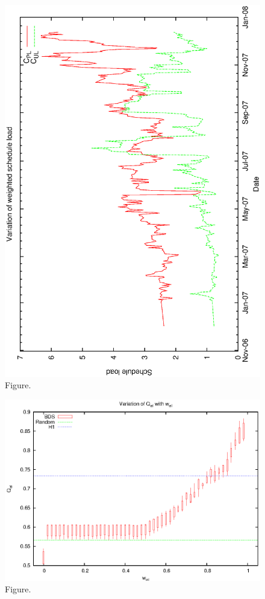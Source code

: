 \documentclass[12pt,a4paper]{article}
\begin{document}
\begin{figure}[htbp]
 \begin{center}
  \includegraphics[scale=1.0, angle=0]{figures/cl_puload.eps}
 \end{center}
  \caption[Figure.]
{Figure.}
\end{figure}
\clearpage
\begin{figure}[htbp]
 \begin{center}
  \includegraphics[scale=1.0, angle=0]{figures/cmp_el.eps}
 \end{center}
  \caption[Figure.]
{Figure.}
\end{figure}
\end{document}
